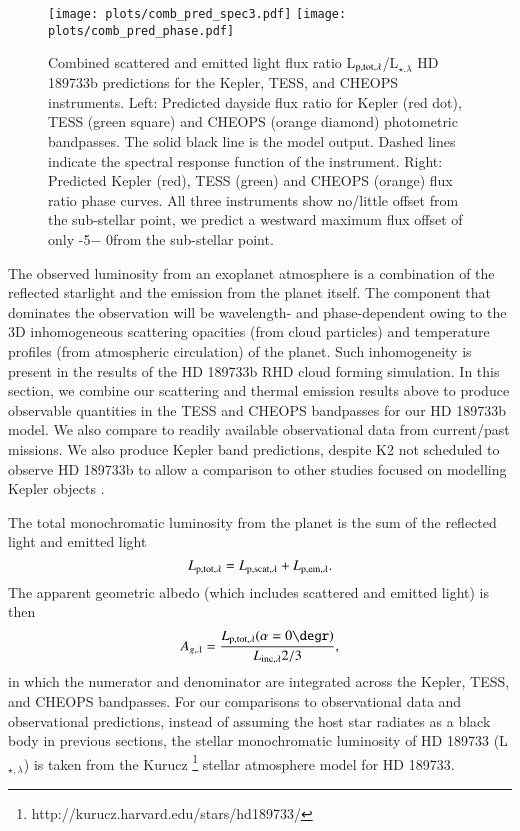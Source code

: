 \documentclass{aa}
\begin{document}
\begin{figure*}
   \centering
   \texttt{[image: plots/comb\_pred\_spec3.pdf]} 
    \texttt{[image: plots/comb\_pred\_phase.pdf]} 
   \caption{Combined scattered and emitted light flux ratio L$_{\rm p,tot,\lambda}$/L$_{\star.\lambda}$ HD 189733b predictions for the Kepler, TESS, and CHEOPS instruments.
   Left: Predicted dayside flux ratio for Kepler (red dot), TESS (green square) and CHEOPS (orange diamond) photometric bandpasses. The solid black line is the model output. Dashed lines indicate the spectral response function of the instrument.
   Right: Predicted Kepler (red), TESS (green) and CHEOPS (orange) flux ratio phase curves. 
   All three instruments show no/little offset from the sub-stellar point, we predict a westward maximum flux offset of only -5\degr$-$ 0\degr from the sub-stellar point.
    }
   \label{fig:comb_phase_pred}
\end{figure*}

The observed luminosity from an exoplanet atmosphere is a combination of the reflected starlight and the emission from the planet itself.
The component that dominates the observation will be wavelength- and phase-dependent owing to the 3D inhomogeneous scattering opacities (from cloud particles) and temperature profiles (from atmospheric circulation) of the planet.
Such inhomogeneity is present in the results of the HD 189733b RHD cloud forming simulation.
In this section, we combine our scattering and thermal emission results above to produce observable quantities in the TESS \citep{Ricker2014} and CHEOPS \citep{Broeg2013} bandpasses for our HD 189733b model.
We also compare to readily available observational data from current/past missions.
We also produce Kepler band predictions, despite K2 not scheduled to observe HD 189733b to allow a comparison to other studies focused on modelling Kepler objects \citep[e.g.][]{Parmentier2016}.

The total monochromatic luminosity from the planet is the sum of the reflected light and emitted light
\begin{equation}
\label{sec:combined}
L_{\rm p, tot, \lambda} = L_{\rm p, scat, \lambda} + L_{\rm p, em, \lambda}.
\end{equation}
The apparent geometric albedo (which includes scattered and emitted light) is then
\begin{equation}
\label{eq:comb_ag}
A_{g, \lambda} = \frac{L_{\rm p, tot, \lambda}(\alpha = 0\degr)}{L_{\rm inc, \lambda} 2/3} ,
\end{equation}
in which the numerator and denominator are integrated across the Kepler, TESS, and CHEOPS bandpasses.
For our comparisons to observational data and observational predictions, instead of assuming the host star radiates as a black body in previous sections, the stellar monochromatic luminosity of HD 189733 (L$_{\star, \lambda}$) is taken from the Kurucz \footnote{http://kurucz.harvard.edu/stars/hd189733/} stellar atmosphere model for HD 189733.
\end{document}

